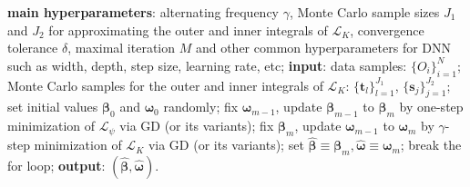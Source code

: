 \documentclass{article}
\def\dnase{{\mathsf{DNA\mbox{-}SE}}}
\def\eff{\mathsf{eff}}
\def\sfb{\mathsf{b}}
\def\sfb{\mathsf{b}}
\def\sfs{\mathsf{s}}
\theoremstyle{plain}
\theoremstyle{definition}
\theoremstyle{remark}
\def\bbeta{\boldsymbol{\beta}}
\def\E{\mathrm{E}}
\def\hat{\widehat}
\begin{document}
\begin{algorithm}
\caption{Pseudocode for $\dnase$}\label{alg:fred}
\begin{algorithmic}[1]
\STATE \textbf{main hyperparameters}: alternating frequency $\gamma$, Monte Carlo sample sizes $J_{1}$ and $J_{2}$ for approximating the outer and inner integrals of $\mathcal{L}_{K}$, convergence tolerance $\delta$, maximal iteration $M$ and other common hyperparameters for DNN such as width, depth, step size, learning rate, etc;
\STATE \textbf{input}: data samples: $\{O_i\}_{i=1}^N$; Monte Carlo samples for the outer and inner integrals of $\mathcal{L}_{K}$: $\{\mathbf{t}_l\}_{l=1}^{J_1}$, $\{\mathbf{s}_j\}_{j = 1}^{J_{2}}$;
\STATE set initial values $\bbeta_{0}$ and $\bm{\omega}_{0}$ randomly;
    \STATE fix $\bm{\omega}_{m - 1}$, update $\bbeta_{m - 1}$ to $\bbeta_{m}$ by one-step minimization of $\mathcal{L}_{\psi}$ via GD (or its variants);
    \STATE fix $\bbeta_{m}$, update $\bm{\omega}_{m - 1}$ to $\bm{\omega}_{m}$ by $\gamma$-step minimization of $\mathcal{L}_{K}$ via GD (or its variants);
    \STATE set $\hat{\bbeta} \equiv \bbeta_{m}, \hat{\bm{\omega}} \equiv \bm{\omega}_{m}$;
    \IF{$\Vert \bbeta_{m} - \bbeta_{m - 1} \Vert_2 < \delta$ and $\Vert \bm{\omega}_{m} - \bm{\omega}_{m - 1} \Vert_2 < \delta$}
    \STATE break the for loop;
    \ENDIF
\ENDFOR
\STATE \textbf{output}: $(\hat{\bbeta}, \widehat{\boldsymbol{\omega}})$.
\end{algorithmic}
\end{algorithm}

\end{document}
